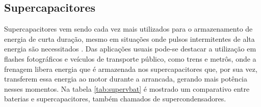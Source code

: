 \subsection{Supercapacitores}
Supercapacitores vem sendo cada vez mais utilizados para o armazenamento de energia de curta duração, mesmo em situações onde pulsos intermitentes de alta energia são necessitados \cite{supercampos}.
Das aplicações usuais pode-se destacar a utilização em flashes fotográficos e veículos de transporte público, como trens e metrôs, onde a frenagem libera energia que é armazenada nos supercapacitores que, por sua vez, transferem essa energia ao motor durante a arrancada, gerando  mais potência nesses momentos.
Na tabela \ref{tab:supervbat} é mostrado um comparativo entre baterias e supercapacitores, também chamados de supercondensadores.

